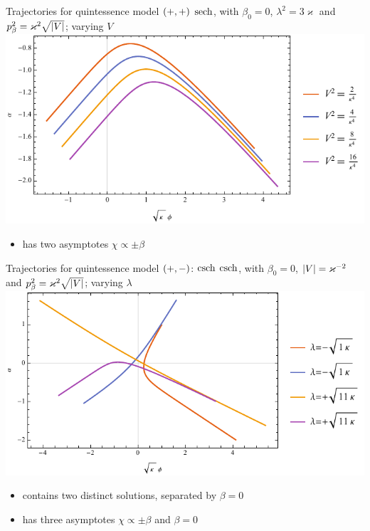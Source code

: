 \documentclass[8pt]{beamer}
\begin{document}
\begin{frame}%
{Trajectories for quintessence model ${\left(+,+\right)}$}%
{$\operatorname{sech}$, with $\beta_0 = 0$, $\lambda^2 = 3\varkappa$ and
$p_\beta^2 = \varkappa^2\sqrt{{\left|V\right|}}$; varying $V$}
\includegraphics[width=\textwidth]{../plots.nb/sech_Vsqr.pdf}
\begin{itemize}
	\item has two asymptotes $\chi \propto \pm \beta$
\end{itemize}
\end{frame}



\begin{frame}%
{Trajectories for quintessence model ${\left(+,-\right)}$: $\operatorname{csch}$}%
{$\operatorname{csch}$, with $\beta_0 = 0$, ${\left|V\right|} = \varkappa^{-2}$ and
$p_\beta^2 = \varkappa^2\sqrt{{\left|V\right|}}$; varying $\lambda$}
\includegraphics[width=\textwidth]{../plots.nb/csch_lamb_r.pdf}
\begin{itemize}
	\item contains two distinct solutions, separated by $\beta = 0$
	\item has three asymptotes $\chi \propto \pm \beta$ and $\beta = 0$
\end{itemize}
\end{frame}
\end{document}
